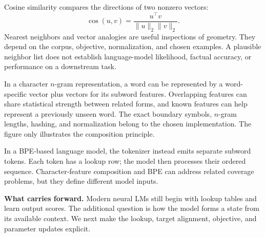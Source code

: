 
Cosine similarity compares the directions of two nonzero vectors:
\[
 \operatorname{cos}(u,v)=\frac{u^\top v}{\|u\|_2\|v\|_2}.
\]
Nearest neighbors and vector analogies are useful inspections of geometry.
They depend on the corpus, objective, normalization, and chosen examples.
A plausible neighbor list does not establish language-model likelihood,
factual accuracy, or performance on a downstream task.


In a character $n$-gram representation, a word can be represented by a
word-specific vector plus vectors for its subword features. Overlapping
features can share statistical strength between related forms, and known
features can help represent a previously unseen word. The exact boundary
symbols, $n$-gram lengths, hashing, and normalization belong to the chosen
implementation. The figure only illustrates the composition principle.

In a BPE-based language model, the tokenizer instead emits separate subword
tokens. Each token has a lookup row; the model then processes their ordered
sequence. Character-feature composition and BPE can address related coverage
problems, but they define different model inputs.

\textbf{What carries forward.} Modern neural LMs still begin with lookup
tables and learn output scores. The additional question is how the model
forms a state from its available context. We next make the lookup, target
alignment, objective, and parameter updates explicit.

